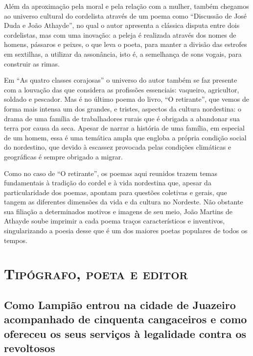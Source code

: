 Além da aproximação pela moral e pela relação com a mulher, também chegamos ao universo cultural do cordelista através de um poema como ``Discussão de José Duda e João
Athayde'', no qual o autor apresenta a clássica disputa entre dois
cordelistas, mas com uma inovação: a peleja é realizada através dos nomes de
homens, pássaros e peixes, o que leva o poeta, para manter a divisão das estrofes em
sextilhas, a utilizar da assonância, isto é, a semelhança de sons vogais,
para construir as rimas. 

Em ``As quatro classes corajosas'' o universo do autor também se faz presente com a louvação das que considera as profissões essenciais: vaqueiro, agricultor, soldado
e pescador. Mas é no último poema do livro, ``O retirante'', que vemos de forma mais intensa um dos grandes, e tristes, aspectos da cultura nordestina: o drama de uma família de trabalhadores rurais que é obrigada a abandonar sua terra por causa da seca.
Apesar de narrar a história de uma família, em especial de um homem, essa é uma temática ampla que engloba a própria condição social do nordestino, que devido à escassez
provocada pelas condições climáticas e geográficas é sempre
obrigado a migrar. 

Como no caso de ``O retirante'', os poemas aqui reunidos trazem temas fundamentais à tradição do cordel e à vida nordestina que, apesar da particularidade dos poemas, apontam para questões coletivas e gerais, que tangem as diferentes dimensões da vida e da cultura no Nordeste. Não obstante sua filiação a determinados motivos e imagens de seu meio, 
João Martins de Athayde soube imprimir a cada poema traços característicos e inventivos, singularizando a poesia desse que é um dos maiores poetas populares de todos os tempos.


\part{\textsc{Tipógrafo, poeta e editor}}

\chapter[Como Lampião entrou na cidade
de Juazeiro]{Como Lampião entrou na cidade
de Juazeiro acompanhado de
cinquenta cangaceiros e como
ofereceu os seus serviços à
legalidade contra os revoltosos}

